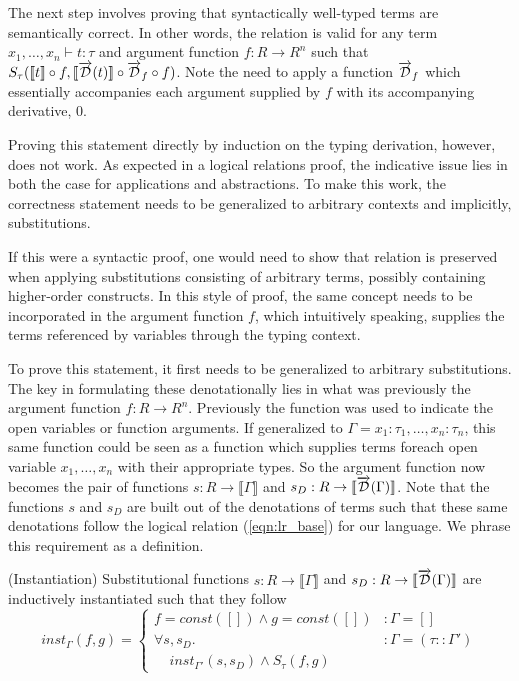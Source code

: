 \documentclass[11pt, final]{article}
\begin{document}
  The next step involves proving that syntactically well-typed terms are semantically correct.
  In other words, the relation is valid for any term $x_1, \dots, x_n \vdash t : \tau$ and argument function $f : R \rightarrow R^n$ such that $S_\tau(\llbracket t \rrbracket \circ f, \llbracket \overrightarrow{\mathcal{D}}(t) \rrbracket \circ \overrightarrow{\mathcal{D}}_f \circ f)$.
  Note the need to apply a function $\overrightarrow{\mathcal{D}}_f$ which essentially accompanies each argument supplied by $f$ with its accompanying derivative, $0$.

  Proving this statement directly by induction on the typing derivation, however, does not work.
  As expected in a logical relations proof, the indicative issue lies in both the case for applications and abstractions.
  To make this work, the correctness statement needs to be generalized to arbitrary contexts and implicitly, substitutions.

  If this were a syntactic proof, one would need to show that relation is preserved when applying substitutions consisting of arbitrary terms, possibly containing higher-order constructs.
  In this style of proof, the same concept needs to be incorporated in the argument function $f$, which intuitively speaking, supplies the terms referenced by variables through the typing context.


  To prove this statement, it first needs to be generalized to arbitrary substitutions.
  The key in formulating these denotationally lies in what was previously the argument function $f : R \rightarrow R^n$.
  Previously the function was used to indicate the open variables or function arguments.
  If generalized to $\Gamma = x_1 : \tau_1, \dots, x_n : \tau_n$, this same function could be seen as a function which supplies terms foreach open variable $x_1, \dots, x_n$ with their appropriate types.
  So the argument function now becomes the pair of functions $s : R \rightarrow \llbracket \Gamma \rrbracket$ and $s_D : R \rightarrow \llbracket \overrightarrow{\mathcal{D}}(\Gamma) \rrbracket$.
  Note that the functions $s$ and $s_D$ are built out of the denotations of terms such that these same denotations follow the logical relation (\ref{eqn:lr_base}) for our language.
  We phrase this requirement as a definition.

  \begin{definition}(Instantiation)
    Substitutional functions $s : R \rightarrow \llbracket \Gamma \rrbracket$ and $s_D : R \rightarrow \llbracket \overrightarrow{\mathcal{D}}(\Gamma) \rrbracket$ are inductively instantiated such that they follow
    \begin{equation}
      inst_\Gamma(f, g) =
        \left\{
          \begin{array}{ll}
            f = const([]) \wedge g = const([])
              & : \Gamma = [] \\
            \forall s, s_D.
              & : \Gamma = (\tau :: \Gamma') \\
              \;\;\;\;inst_{\Gamma'}(s, s_D) \wedge S_\tau(f, g)
          \end{array}
        \right.
    \label{eqn:lr_base}
    \end{equation}
  \end{definition}
\end{document}
